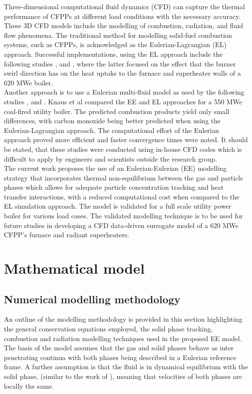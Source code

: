 \documentclass{webofc}
\begin{document}
Three-dimensional computational fluid dynamics (CFD) can capture the thermal performance of CFPPs at different load conditions with the necessary accuracy. These 3D CFD models include the modelling of combustion, radiation, and fluid flow phenomena. The traditional method for modelling
solid-fuel combustion systems, such as CFPPs, is acknowledged as the Eulerian-Lagrangian (EL) approach. Successful implementations, using the EL approach include the following studies \cite{bohnstein},\cite{laubscher_1} and \cite{laubscher_2}, where the latter focused on the effect that the burner swirl direction has on the heat uptake to the furnace and superheater walls of a 620 MWe boiler.\\

Another approach is to use a Eulerian multi-fluid model as used by the following studies \cite{epple}, \cite{cai} and \cite{wu}. Knaus et al \cite{knaus} compared the EE and EL approaches for a 550 MWe coal-fired utility boiler. The predicted combustion products yield only small differences, with carbon monoxide being better predicted when using the Eulerian-Lagrangian approach. The computational effort of the Eulerian approach proved more efficient and faster convergence times were noted. It should be stated, that these studies were conducted using in-house CFD codes which is difficult to apply by engineers and scientists outside the research group.\\

The current work proposes the use of an Eulerian-Eulerian (EE) modelling strategy that incorporates thermal non-equilibrium between the gas and particle phases which allows for adequate particle concentration tracking and heat transfer interactions, with a reduced computational cost when compared to the EL simulation approach. The model is validated for a full scale utility power boiler for various load cases. The validated modelling technique is to be used for future studies in developing a CFD data-driven surrogate model of a 620 MWe CFPP's furnace and radiant superheaters. 

\section{Mathematical model} \label{Theory}
\subsection{Numerical modelling methodology}
An outline of the modelling methodology is provided in this section highlighting the general conservation equations employed, the solid phase tracking, combustion and radiation modelling techniques used in the proposed EE model. The basis of the model assumes that the gas and solid phases behave as inter penetrating continua with both phases being described in a Eulerian reference frame. A further assumption is that the fluid is in dynamical equilibrium with the solid phase, (similar to the work of \cite{epple}), meaning that velocities of both phases are locally the same.
\end{document}
